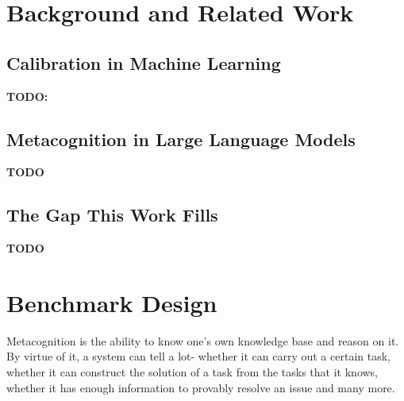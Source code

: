 \documentclass{article}
\begin{document}
\section{Background and Related Work}

\subsection{Calibration in Machine Learning}

\textbf{TODO: }

\subsection{Metacognition in Large Language Models}
%

\textbf{TODO}

\subsection{The Gap This Work Fills}

\textbf{TODO}


\section{Benchmark Design}
\label{sec:design}
Metacognition is the ability to know one's own knowledge base and reason on it. By virtue of it, a system can tell a lot- whether it can carry out a certain task, whether it can construct the solution of a task from the tasks that it knows, whether it has enough information to provably resolve an issue and many more.
\end{document}
